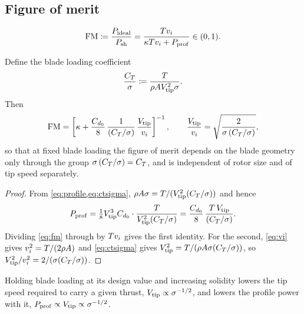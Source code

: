 \subsection{Figure of merit}

\begin{definition}
\begin{equation}
  \mathrm{FM} \coloneqq \frac{P_{\mathrm{ideal}}}{P_{\mathrm{sh}}}
      = \frac{Tv_i}{\kappa Tv_i + P_{\mathrm{prof}}} \in (0,1) .
  \label{eq:fm}
\end{equation}
\end{definition}

\begin{proposition}
\label{prop:fmblade}
Define the blade loading coefficient
\begin{equation}
  \frac{C_T}{\sigma} \coloneqq \frac{T}{\rho A V_{\mathrm{tip}}^2 \sigma} .
  \label{eq:ctsigma}
\end{equation}
Then
\begin{equation}
  \mathrm{FM} = \left[\kappa + \frac{C_{d_0}}{8}\,
        \frac{1}{(C_T/\sigma)}\,\frac{V_{\mathrm{tip}}}{v_i}\right]^{-1},
  \qquad
  \frac{V_{\mathrm{tip}}}{v_i} = \sqrt{\frac{2}{\sigma\,(C_T/\sigma)}} ,
  \label{eq:fmclosed}
\end{equation}
so that at fixed blade loading the figure of merit depends on the blade
geometry only through the group $\sigma\,(C_T/\sigma) = C_T$, and is
independent of rotor size and of tip speed separately.
\end{proposition}

\begin{proof}
From \cref{eq:profile,eq:ctsigma}, $\rho A \sigma = T/(V_{\mathrm{tip}}^2 (C_T/\sigma))$
and hence
\[
  P_{\mathrm{prof}} = \tfrac18 V_{\mathrm{tip}}^3 C_{d_0} \cdot \frac{T}{V_{\mathrm{tip}}^2 (C_T/\sigma)}
         = \frac{C_{d_0}}{8}\,\frac{T\,V_{\mathrm{tip}}}{(C_T/\sigma)} .
\]
Dividing \cref{eq:fm} through by $Tv_i$ gives the first identity. For the
second, \cref{eq:vi} gives $v_i^2 = T/(2\rho A)$ and \cref{eq:ctsigma} gives
$V_{\mathrm{tip}}^2 = T/(\rho A \sigma (C_T/\sigma))$, so
$V_{\mathrm{tip}}^2/v_i^2 = 2/(\sigma (C_T/\sigma))$.
\end{proof}

\begin{corollary}
\label{cor:designrule}
Holding blade loading at its design value and increasing solidity lowers the
tip speed required to carry a given thrust,
$V_{\mathrm{tip}} \propto \sigma^{-1/2}$, and lowers the profile power with it,
$P_{\mathrm{prof}} \propto V_{\mathrm{tip}} \propto \sigma^{-1/2}$.
\end{corollary}

